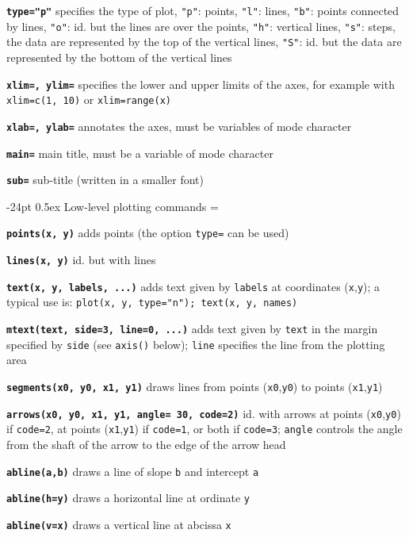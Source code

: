 \documentclass[10pt,landscape]{article}
\makeatletter
\renewcommand\section{\@startsection{section}{1}{0mm}%
                                     {-24pt}%
                                     {0.5ex}%
                                {\color{blue}\normalfont\large\bfseries}}
\newcommand{\code}{\texttt}
\newcommand{\bcode}[1]{\texttt{\textbf{#1}}}
\makeatother
\begin{document}
\begin{multicols*}{3}
\bcode{type="p"}  specifies the type of plot, \code{"p"}: points, \code{"l"}: lines, \code{"b"}: points connected by lines, \code{"o"}: id. but the lines are over the points, \code{"h"}: vertical lines, \code{"s"}: steps, the data are represented by the top of the vertical lines, \code{"S"}: id. but the data are represented by the bottom of the vertical lines

\bcode{xlim=, ylim=}  specifies the lower and upper limits of the axes, for example with \code{xlim=c(1, 10)} or \code{xlim=range(x)}

\bcode{xlab=, ylab=}  annotates the axes, must be variables of mode character

\bcode{main=}  main title, must be a variable of mode character

\bcode{sub=}  sub-title (written in a smaller font)




\section{Low-level plotting commands}
\everypar={\hangindent=9mm}

\bcode{points(x, y)}  adds points (the option \code{type=} can be used)

\bcode{lines(x, y)}  id. but with lines

\bcode{text(x, y, \mbox{labels}, ...)}  adds text given by \code{labels} at coordinates (\code{x},\code{y}); a typical use is: \code{plot(x, y, type="n"); text(x, y, names)}

\bcode{mtext(text, side=3, line=0, ...)}  adds text given by \code{text} in the margin specified by \code{side} (see \code{axis()} below); \code{line} specifies the line from the plotting area

\bcode{segments(x0, y0, x1, y1)}  draws lines from points (\code{x0},\code{y0}) to points (\code{x1},\code{y1})

\bcode{arrows(x0, y0, x1, y1, angle= 30, code=2)}  id. with arrows at points (\code{x0},\code{y0}) if \code{code=2}, at points (\code{x1},\code{y1}) if \code{code=1}, or both if \code{code=3}; \code{angle} controls the angle from the shaft of the arrow to the edge of the arrow head

\bcode{abline(a,b)}  draws a line of slope \code{b} and intercept \code{a}

\bcode{abline(h=y)}  draws a horizontal line at ordinate \code{y}

\bcode{abline(v=x)}  draws a vertical line at abcissa \code{x}


\end{multicols*}
\end{document}
